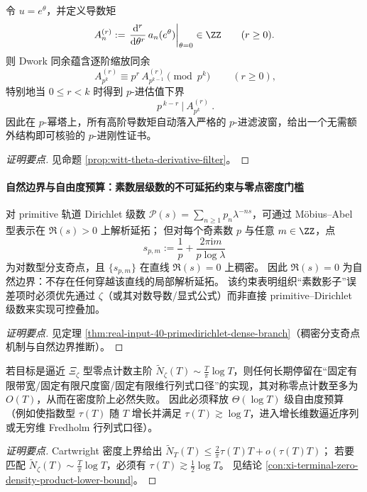 \begin{conclusion}\label{con:xi-theta-derivative-padic-filter}
令 \(u=e^\theta\)，并定义导数矩
\[
A_{n}^{(r)}:=\left.\frac{\mathrm{d}^r}{\mathrm{d}\theta^r}\,a_n(e^\theta)\right|_{\theta=0}\in\ZZ\qquad(r\ge 0).
\]
则 Dwork 同余蕴含逐阶缩放同余
\[
\boxed{\ A_{p^k}^{(r)}\equiv p^r\,A_{p^{k-1}}^{(r)}\pmod{p^k}\ }\qquad(r\ge 0),
\]
特别地当 \(0\le r<k\) 时得到 \(p\)-进估值下界
\[
\boxed{\ p^{\,k-r}\ \big|\ A_{p^k}^{(r)}\ }.
\]
因此在 \(p\)-幂塔上，所有高阶导数矩自动落入严格的 \(p\)-进滤波窗，给出一个无需额外结构即可核验的 \(p\)-进刚性证书。
\end{conclusion}
\begin{proof}[证明要点]
见命题 \ref{prop:witt-theta-derivative-filter}。
\end{proof}

\paragraph{自然边界与自由度预算：素数层级数的不可延拓约束与零点密度门槛}

\begin{conclusion}[primitive--Dirichlet 级数的自然边界：\texorpdfstring{$\Re(s)=0$}{Re(s)=0} 上稠密分支奇点强制不可延拓]\label{con:xi-primedirichlet-natural-boundary}
对 primitive 轨道 Dirichlet 级数 \(\mathcal{P}(s)=\sum_{n\ge 1}p_n\lambda^{-ns}\)，可通过 M\"obius--Abel 型表示在 \(\Re(s)>0\) 上解析延拓；
但对每个奇素数 \(p\) 与任意 \(m\in\ZZ\)，点
\[
s_{p,m}:=\frac{1}{p}+\frac{2\pi \mathrm{i} m}{p\log\lambda}
\]
为对数型分支奇点，且 \(\{s_{p,m}\}\) 在直线 \(\Re(s)=0\) 上稠密。
因此 \(\Re(s)=0\) 为自然边界：不存在任何穿越该直线的局部解析延拓。
该约束表明组织“素数影子”误差项时必须优先通过 \(\zeta\)（或其对数导数/显式公式）而非直接 primitive--Dirichlet 级数来实现可控叠加。
\end{conclusion}
\begin{proof}[证明要点]
见定理 \ref{thm:real-input-40-primedirichlet-dense-branch}（稠密分支奇点机制与自然边界推断）。
\end{proof}

\begin{conclusion}\label{con:xi-finite-dimension-dirichlet-logT-threshold}
若目标是逼近 \(\Xi_\zeta\) 型零点计数主阶 \(\widetilde N_\zeta(T)\sim \tfrac{T}{\pi}\log T\)，则任何长期停留在“固定有限带宽/固定有限尺度窗/固定有限维行列式口径”的实现，其对称零点计数至多为 \(O(T)\)，从而在密度阶上必然失败。
因此必须释放 \(\Theta(\log T)\) 级自由度预算（例如使指数型 \(\tau(T)\) 随 \(T\) 增长并满足 \(\tau(T)\gtrsim \log T\)，进入增长维数逼近序列或无穷维 Fredholm 行列式口径）。
\end{conclusion}
\begin{proof}[证明要点]
Cartwright 密度上界给出 \(\widetilde N_T(T)\le \frac{2}{\pi}\tau(T)T+o(\tau(T)T)\)；
若要匹配 \(\widetilde N_\zeta(T)\sim \frac{T}{\pi}\log T\)，必须有 \(\tau(T)\gtrsim \frac12\log T\)。
见结论 \ref{con:xi-terminal-zero-density-product-lower-bound}。
\end{proof}

